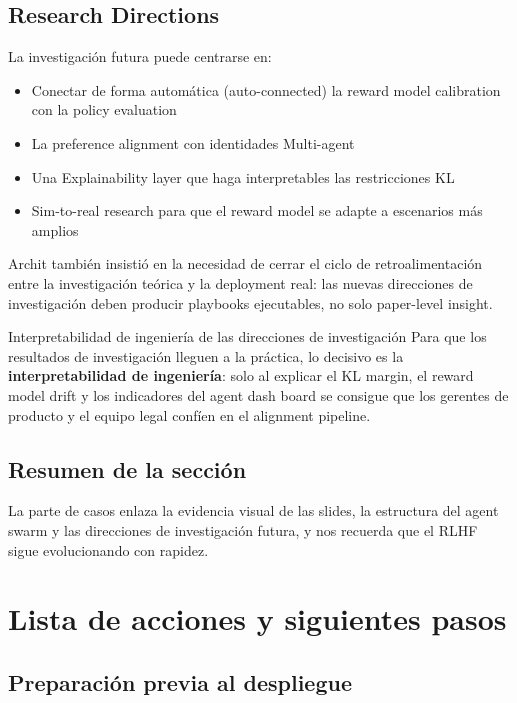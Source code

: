 \documentclass[a4paper]{article}
\begin{document}
\subsection{Research Directions}

La investigación futura puede centrarse en:

\begin{itemize}
    \item Conectar de forma automática (auto-connected) la reward model calibration con la policy evaluation
    \item La preference alignment con identidades Multi-agent
    \item Una Explainability layer que haga interpretables las restricciones KL
    \item Sim-to-real research para que el reward model se adapte a escenarios más amplios
\end{itemize}

Archit también insistió en la necesidad de cerrar el ciclo de retroalimentación entre la investigación teórica y la deployment real: las nuevas direcciones de investigación deben producir playbooks ejecutables, no solo paper-level insight.

\begin{knowledgebox}{Interpretabilidad de ingeniería de las direcciones de investigación}
Para que los resultados de investigación lleguen a la práctica, lo decisivo es la \textbf{interpretabilidad de ingeniería}: solo al explicar el KL margin, el reward model drift y los indicadores del agent dash board se consigue que los gerentes de producto y el equipo legal confíen en el alignment pipeline.
\end{knowledgebox}

\subsection{Resumen de la sección}

La parte de casos enlaza la evidencia visual de las slides, la estructura del agent swarm y las direcciones de investigación futura, y nos recuerda que el RLHF sigue evolucionando con rapidez.
\section{Lista de acciones y siguientes pasos}

\subsection{Preparación previa al despliegue}
\end{document}
